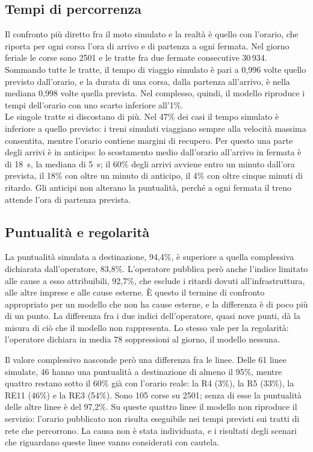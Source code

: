 \subsection{Tempi di percorrenza}
Il confronto più diretto fra il moto simulato e la realtà è quello con l'orario, che riporta per ogni corsa l'ora di arrivo e di partenza a ogni fermata. Nel giorno feriale le corse sono 2501 e le tratte fra due fermate consecutive 30\,934. \\
Sommando tutte le tratte, il tempo di viaggio simulato è pari a 0,996 volte quello previsto dall'orario, e la durata di una corsa, dalla partenza all'arrivo, è nella mediana 0,998 volte quella prevista. Nel complesso, quindi, il modello riproduce i tempi dell'orario con uno scarto inferiore all'1\%. \\
Le singole tratte si discostano di più. Nel 47\% dei casi il tempo simulato è inferiore a quello previsto: i treni simulati viaggiano sempre alla velocità massima consentita, mentre l'orario contiene margini di recupero. Per questo una parte degli arrivi è in anticipo: lo scostamento medio dall'orario all'arrivo in fermata è di \SI{18}{\second}, la mediana di \SI{5}{\second}; il 60\% degli arrivi avviene entro un minuto dall'ora prevista, il 18\% con oltre un minuto di anticipo, il 4\% con oltre cinque minuti di ritardo. Gli anticipi non alterano la puntualità, perché a ogni fermata il treno attende l'ora di partenza prevista.

\subsection{Puntualità e regolarità}
La puntualità simulata a destinazione, 94,4\%, è superiore a quella complessiva dichiarata dall'operatore, 83,8\%. L'operatore pubblica però anche l'indice limitato alle cause a esso attribuibili, 92,7\%, che esclude i ritardi dovuti all'infrastruttura, alle altre imprese e alle cause esterne. È questo il termine di confronto appropriato per un modello che non ha cause esterne, e la differenza è di poco più di un punto. La differenza fra i due indici dell'operatore, quasi nove punti, dà la misura di ciò che il modello non rappresenta. Lo stesso vale per la regolarità: l'operatore dichiara in media 78 soppressioni al giorno, il modello nessuna.

Il valore complessivo nasconde però una differenza fra le linee. Delle 61 linee simulate, 46 hanno una puntualità a destinazione di almeno il 95\%, mentre quattro restano sotto il 60\% già con l'orario reale: la R4 (3\%), la R5 (33\%), la RE11 (46\%) e la RE3 (54\%). Sono 105 corse su 2501; senza di esse la puntualità delle altre linee è del 97,2\%. Su queste quattro linee il modello non riproduce il servizio: l'orario pubblicato non risulta eseguibile nei tempi previsti sui tratti di rete che percorrono. La causa non è stata individuata, e i risultati degli scenari che riguardano queste linee vanno considerati con cautela.

